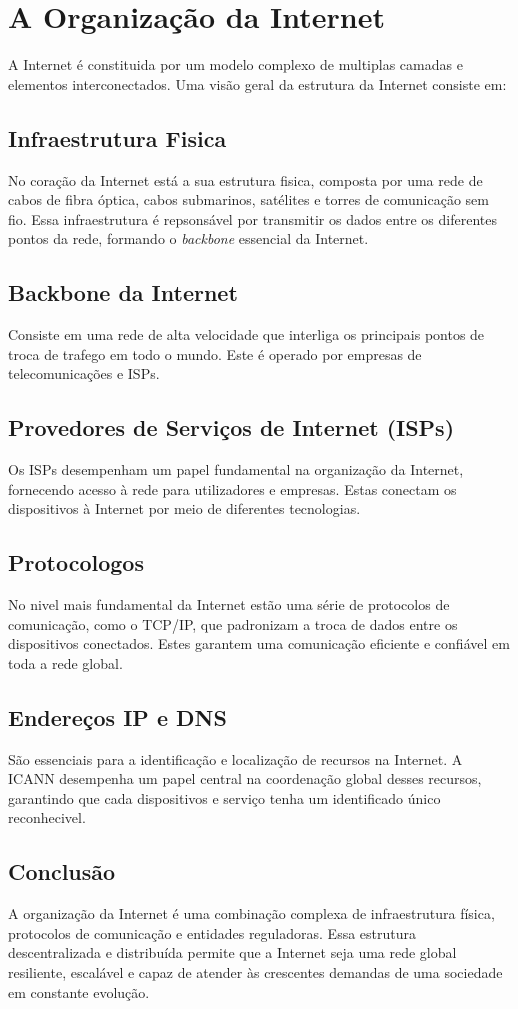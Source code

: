 \section{A Organização da Internet}
\label{sec:organization}
A Internet é constituida por um modelo complexo de multiplas camadas e elementos interconectados.
Uma visão geral da estrutura da Internet consiste em:

\subsection{Infraestrutura Fisica}
No coração da Internet está a sua estrutura fisica, composta por uma rede de cabos 
de fibra óptica, cabos submarinos, satélites e torres de comunicação sem fio.
Essa infraestrutura é repsonsável por transmitir os dados entre os diferentes pontos
da rede, formando o \textit{backbone} essencial da Internet.

\subsection{Backbone da Internet}
Consiste em uma rede de alta velocidade que interliga os principais pontos de troca 
de trafego em todo o mundo. Este é operado por empresas de telecomunicações e ISPs.

\subsection{Provedores de Serviços de Internet (ISPs)}
Os ISPs desempenham um papel fundamental na organização da Internet, fornecendo acesso à
rede para utilizadores e empresas. Estas conectam os dispositivos à Internet por meio de 
diferentes tecnologias.

\subsection{Protocologos}
No nivel mais fundamental da Internet estão uma série de protocolos de comunicação, como 
o TCP/IP, que padronizam a troca de dados entre os dispositivos conectados. Estes garantem
uma comunicação eficiente e confiável em toda a rede global.

\subsection{Endereços IP e DNS}
São essenciais para a identificação e localização de recursos na Internet. A ICANN desempenha 
um papel central na coordenação global desses recursos, garantindo que cada dispositivos
e serviço tenha um identificado único reconhecivel.

\subsection{Conclusão}
A organização da Internet é uma combinação complexa de infraestrutura física, 
protocolos de comunicação e entidades reguladoras. Essa estrutura descentralizada 
e distribuída permite que a Internet seja uma rede global resiliente, escalável 
e capaz de atender às crescentes demandas de uma sociedade em constante evolução. 